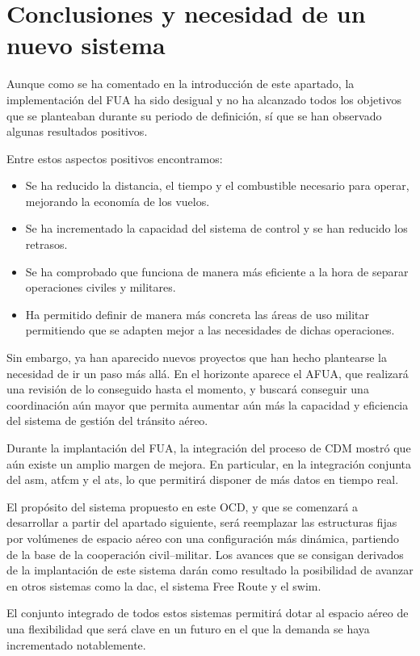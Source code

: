 \section{Conclusiones y necesidad de un nuevo sistema}

Aunque como se ha comentado en la introducción de este apartado, la implementación del FUA ha sido desigual y no ha alcanzado todos los objetivos que se planteaban durante su periodo de definición, sí que se han observado algunas resultados positivos.

Entre estos aspectos positivos encontramos:

\begin{itemize}
    \item Se ha reducido la distancia, el tiempo y el combustible necesario para operar, mejorando la economía de los vuelos.
    \item Se ha incrementado la capacidad del sistema de control y se han reducido los retrasos.
    \item Se ha comprobado que funciona de manera más eficiente a la hora de separar operaciones civiles y militares.
    \item Ha permitido definir de manera más concreta las áreas de uso militar permitiendo que se adapten mejor a las necesidades de dichas operaciones.
\end{itemize}

Sin embargo, ya han aparecido nuevos proyectos que han hecho plantearse la necesidad de ir un paso más allá. En el horizonte aparece el AFUA, que realizará una revisión de lo conseguido hasta el momento, y buscará conseguir una coordinación aún mayor que permita aumentar aún más la capacidad y eficiencia del sistema de gestión del tránsito aéreo.

Durante la implantación del FUA, la integración del proceso de CDM mostró que aún existe un amplio margen de mejora. En particular, en la integración conjunta del \acrfull{asm}, \acrfull{atfcm} y el \acrfull{ats}, lo que permitirá disponer de más datos en tiempo real.

El propósito del sistema propuesto en este OCD, y que se comenzará a desarrollar a partir del apartado siguiente, será reemplazar las estructuras fijas por volúmenes de espacio aéreo con una configuración más dinámica, partiendo de la base de la cooperación civil–militar. Los avances que se consigan derivados de la implantación de este sistema darán como resultado la posibilidad de avanzar en otros sistemas como la \acrfull{dac}, el sistema Free Route y el \acrfull{swim}.

El conjunto integrado de todos estos sistemas permitirá dotar al espacio aéreo de una flexibilidad que será clave en un futuro en el que la demanda se haya incrementado notablemente.

